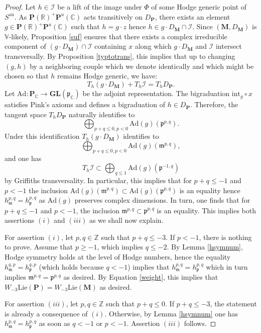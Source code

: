 \documentclass[10pt]{article}
\numberwithin{equation}{subsection}
\theoremstyle{plain}
\theoremstyle{definition}
\theoremstyle{remark}
\newcommand{\lie}{\mathrm{Lie}}
\newcommand{\I}{\mathscr{I}}
\newcommand{\Z}{\mathbb Z}
\newcommand{\C}{\mathbb C}
\newcommand{\R}{\mathbb R}
\newcommand{\V}{\mathbb V}
\newcommand{\pp}{\mathbf P}
\newcommand{\M}{\mathbf M}
\newcommand{\an}{\mathrm{an}}
\newcommand{\gl}{\mathbf{GL}}
\newcommand{\para}{\mathfrak{p}}
\newcommand{\mt}{\mathfrak{m}}
\newcommand{\Ad}{\mathrm{Ad}}
\newcommand{\intt}{\mathrm{int}}
\begin{document}
\begin{proof}
Let $h \in \I$ be a lift of the image under $\Phi$ of some Hodge generic point of $S^\an$. As $\pp(\R)^+ \pp^u(\C)$ acts transitively on $D_\pp$, there exists an element $g \in \pp(\R)^+ \pp^u(\C)$ such that $h = g \cdot z$ hence $h \in g \cdot D_\M \cap \I$. Since $(\M,D_\M)$ is $\V$-likely, Proposition \ref{suf} ensures that there exists a complex irreducible component of $(g \cdot D_\M) \cap \I$ containing $x$ along which $g \cdot D_\M$ and $\I$ intersect transversally. By Proposition \ref{typtotrans}, this implies that up to changing $(g,h)$ by a neighboring couple which we denote identically and which might be chosen so that $h$ remains Hodge generic, we have:
\[
T_h (g \cdot D_\M) + T_h \I = T_h D_\pp.
\]
Let $\Ad : \pp_\C \rightarrow \gl(\para_\C)$ be the adjoint representation. The bigraduation $\intt_{g} \circ x$ satisfies Pink's axioms and defines a bigraduation of $h \in D_\pp$. Therefore, the tangent space $T_h D_\pp$ naturally identifies to \[\bigoplus_{p+q \leqslant 0, p<0} \Ad(g)(\para^{p,q}).\] Under this identification $T_h (g \cdot D_\M)$ identifies to \[\bigoplus_{p+q \leqslant 0, p<0} \Ad(g)(\mt^{p,q}),\] and one has \[T_h \I \subset \bigoplus_{q \leqslant 1}\Ad(g)(\para^{-1,q})\] by Griffiths transversality. In particular, this implies that for $p+q \leqslant -1$ and $p < -1$ the inclusion $\Ad(g)(\mt^{p,q}) \subset \Ad(g)(\para^{p,q})$ is an equality hence $h_\mt^{p,q} = h_\para^{p,q}$ as $\Ad(g)$ preserves complex dimensions. In turn, one finds that for $p+q \leqslant -1$ and $p<-1$, the inclusion $\mt^{p,q} \subset \para^{p,q}$ is an equality. This implies both assertions $(i)$ and $(iii)$ as we shall now explain.

For assertion $(i)$, let $p,q \in \Z$ such that $p+q \leqslant -3$. If $p < -1$, there is nothing to prove. Assume that $p \geqslant -1$, which implies $q \leqslant -2$. By Lemma \ref{hsymnum}, Hodge symmetry holds at the level of Hodge numbers, hence the equality $h_{\mt}^{q,p} = h_{\para}^{q,p}$ (which holds because $q < -1$) implies that $h_\mt^{p,q} = h_{\para}^{p,q}$ which in turn implies $\mt^{p,q} = \para^{p,q}$ as desired. By Equation \ref{weight}, this implies that $W_{-3} \lie(\pp) = W_{-3} \lie(\M)$ as desired.

For assertion $(iii)$, let $p,q \in \Z$ such that $p+q \leqslant 0$. If $p+q \leqslant -3$, the statement is already a consequence of $(i)$. Otherwise, by Lemma \ref{hsymnum} one has $h_\mt^{p,q} = h_{\para}^{p,q}$ as soon as $q<-1$ or $p<-1$.  Assertion $(iii)$ follows.


\end{proof}
\end{document}
